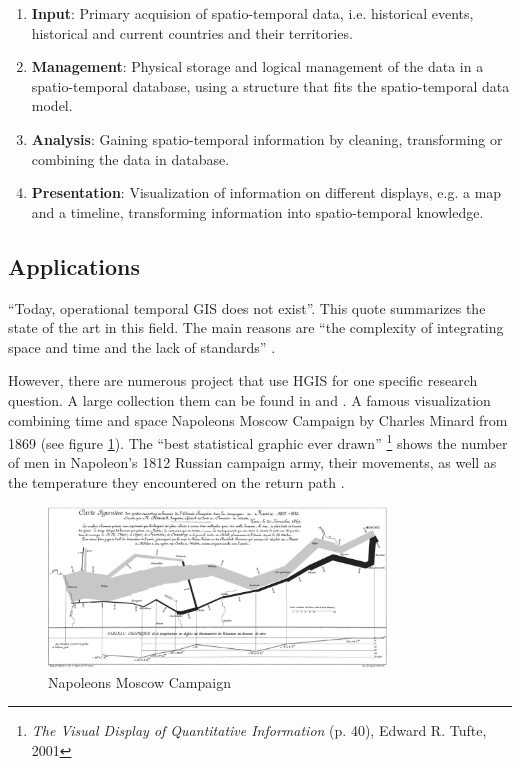 \begin{enumerate}
  \item \textbf{Input}: Primary acquision of spatio-temporal data, i.e. historical events, historical and current countries and their territories.
  \item \textbf{Management}: Physical storage and logical management of the data in a spatio-temporal database, using a structure that fits the spatio-temporal data model.
  \item \textbf{Analysis}: Gaining spatio-temporal information by cleaning, transforming or combining the data in database.
  \item \textbf{Presentation}: Visualization of information on different displays, e.g. a map and a timeline, transforming information into spatio-temporal knowledge.
\end{enumerate}


\subsection{Applications} %
\label{sub:applications}

``Today, operational temporal GIS does not exist''. This quote summarizes the state of the art in this field. The main reasons are ``the complexity of integrating space and time and the lack of standards''
\cite[p. 5]{raza12}.

However, there are numerous project that use HGIS for one specific research question. A large collection them can be found in \cite{knowles2008placing} and \cite{gregory2014toward}. A famous visualization combining time and space Napoleons Moscow Campaign by Charles Minard from 1869 (see figure \ref{fig:minard_napoleon}). The ``best statistical graphic ever drawn''
\footnote{
  \emph{The Visual Display of Quantitative Information} (p. 40),
  Edward R. Tufte,
  2001
}
shows the number of men in Napoleon’s 1812 Russian campaign army, their movements, as well as the temperature they encountered on the return path
\cite[pp. 188-191]{knowles2008placing}.

\begin{figure}[ht]
  \centering
  \includegraphics[width=0.8\textwidth]{graphics/basics/napoleon_march_moscow.png}
  \caption{Napoleons Moscow Campaign \protect\footnotemark}
  \label{fig:minard_napoleon}
\end{figure}

